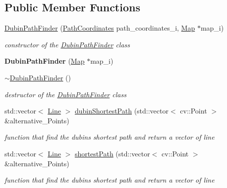 \subsection*{Public Member Functions}
\begin{DoxyCompactItemize}
\item 
\mbox{\hyperlink{class_dubin_path_finder_a111ab0ee03f0c67270987f5fdb474aec}{Dubin\+Path\+Finder}} (\mbox{\hyperlink{class_path_coordinates}{Path\+Coordinates}} path\+\_\+coordinates\+\_\+i, \mbox{\hyperlink{class_map}{Map}} $\ast$map\+\_\+i)
\begin{DoxyCompactList}\small\item\em constructor of the \mbox{\hyperlink{class_dubin_path_finder}{Dubin\+Path\+Finder}} class \end{DoxyCompactList}\item 
\mbox{\label{class_dubin_path_finder_ab237970d0782eb2c688e6f71a14d10d3}} 
{\bfseries Dubin\+Path\+Finder} (\mbox{\hyperlink{class_map}{Map}} $\ast$map\+\_\+i)
\item 
\mbox{\label{class_dubin_path_finder_aec268dff5044bd69f5622b781911c2de}} 
\mbox{\hyperlink{class_dubin_path_finder_aec268dff5044bd69f5622b781911c2de}{$\sim$\+Dubin\+Path\+Finder}} ()
\begin{DoxyCompactList}\small\item\em destructor of the \mbox{\hyperlink{class_dubin_path_finder}{Dubin\+Path\+Finder}} class \end{DoxyCompactList}\item 
std\+::vector$<$ \mbox{\hyperlink{class_line}{Line}} $>$ \mbox{\hyperlink{class_dubin_path_finder_acec45029cf276492787699e4d04d2779}{dubin\+Shortest\+Path}} (std\+::vector$<$ cv\+::\+Point $>$ \&alternative\+\_\+\+Points)
\begin{DoxyCompactList}\small\item\em function that find the dubins shortest path and return a vector of line \end{DoxyCompactList}\item 
std\+::vector$<$ \mbox{\hyperlink{class_line}{Line}} $>$ \mbox{\hyperlink{class_dubin_path_finder_adc5d730f6226c4d92202b0ff4126cbb2}{shortest\+Path}} (std\+::vector$<$ cv\+::\+Point $>$ \&alternative\+\_\+\+Points)
\begin{DoxyCompactList}\small\item\em function that find the dubins shortest path and return a vector of line \end{DoxyCompactList}\end{DoxyCompactItemize}
